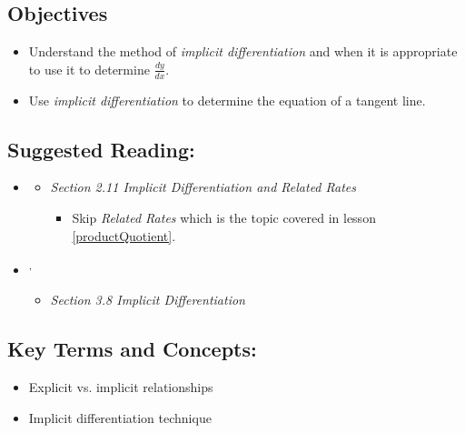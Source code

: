 \vspace{-0.25 in}
\begin{framed}
\subsection*{Objectives}
\begin{itemize}
    \item Understand the method of \emph{implicit differentiation} and when it is appropriate to use it to determine $\displaystyle\frac{dy}{dx}$.
    \item Use \emph{implicit differentiation} to determine the equation of a tangent line.
\end{itemize}

\subsection*{Suggested Reading:}
\begin{itemize}
\item \cite{Calaway}\footnotemark[1]
   \begin{itemize}
        \item \emph{Section 2.11 Implicit Differentiation and Related Rates}
        \begin{itemize}
            \item Skip \emph{Related Rates} which is the topic covered in lesson \ref{productQuotient}.
        \end{itemize}
    \end{itemize}

\item \cite{openstax}\footnotemark[2]\textsuperscript{,}\footnotemark[3]
    \begin{itemize}
        \item \emph{Section 3.8 Implicit Differentiation}
    \end{itemize}
\end{itemize}
\subsection*{Key Terms and Concepts:} 

\begin{multicols}{2}
\begin{itemize}
    \item Explicit vs. implicit relationships
    \item Implicit differentiation technique
\end{itemize}
\end{multicols}
\end{framed}
